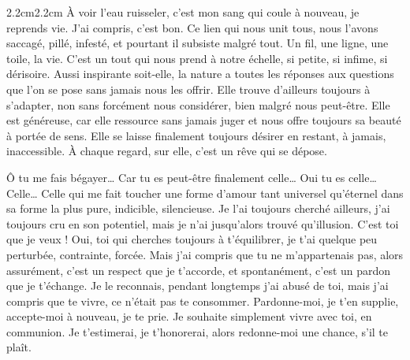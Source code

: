 \begin{adjustwidth}{2.2cm}{2.2cm}
À voir l’eau ruisseler, c’est mon sang qui coule à nouveau, je reprends vie. J’ai compris, c’est bon. Ce lien qui nous unit tous, nous l’avons saccagé, pillé, infesté, et pourtant il subsiste malgré tout. Un fil, une ligne, une toile, la vie. C’est un tout qui nous prend à notre échelle, si petite, si infime, si dérisoire. Aussi inspirante soit-elle, la nature a toutes les réponses aux questions que l’on se pose sans jamais nous les offrir. Elle trouve d’ailleurs toujours à s’adapter, non sans forcément nous considérer, bien malgré nous peut-être. Elle est généreuse, car elle ressource sans jamais juger et nous offre toujours sa beauté à portée de sens. Elle se laisse finalement toujours désirer en restant, à jamais, inaccessible. À chaque regard, sur elle, c’est un rêve qui se dépose.

Ô tu me fais bégayer… Car tu es peut-être finalement celle… Oui tu es celle… Celle… Celle qui me fait toucher une forme d’amour tant universel qu’éternel dans sa forme la plus pure, indicible, silencieuse. Je l’ai toujours cherché ailleurs, j’ai toujours cru en son potentiel, mais je n’ai jusqu’alors trouvé qu’illusion. C’est toi que je veux ! Oui, toi qui cherches toujours à t’équilibrer, je t’ai quelque peu perturbée, contrainte, forcée. Mais j’ai compris que tu ne m’appartenais pas, alors assurément, c’est un respect que je t’accorde, et spontanément, c’est un pardon que je t’échange. Je le reconnais, pendant longtemps j’ai abusé de toi, mais j’ai compris que te vivre, ce n’était pas te consommer. Pardonne-moi, je t’en supplie, accepte-moi à nouveau, je te prie. Je souhaite simplement vivre avec toi, en communion. Je t’estimerai, je t’honorerai, alors redonne-moi une chance, s’il te plaît.


\end{adjustwidth}

